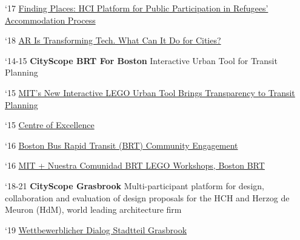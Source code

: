 \begin{tablist}
\begin{tablist}
      \item[`17] \tab \href{https://www.media.mit.edu/publications/finding-places/}{Finding Places: HCI Platform for Public Participation in Refugees’ Accommodation Process}

      \item[`18] \tab  \href{https://datasmart.ash.harvard.edu/news/article/ar-transforming-tech-what-can-it-do-cities}{AR Is Transforming Tech. What Can It Do for Cities?}

   \end{tablist}


   \item[`14-15] \tab \textbf{CityScope BRT For Boston} {Interactive Urban Tool for Transit Planning}

   \begin{tablist}

      \item[`15] \tab  \href{https://www.bloomberg.com/news/articles/2015-10-16/mit-s-new-interactive-lego-urban-tool-brings-transparency-to-transit-planning}
      {MIT's New Interactive LEGO Urban Tool Brings Transparency to Transit Planning}

      \item[`15] \tab  \href{http://www.brt.cl/new-tools-for-a-new-era-of-open-transportation-planning/}
      {Centre of Excellence}

      \item[`16] \tab  \href{https://www.media.mit.edu/projects/CityscopeBostonBRT/overview/}
      {Boston Bus Rapid Transit (BRT) Community Engagement}

      \item[`16] \tab  \href{http://www.bostonbrt.org/mit-nuestra-comunidad-brt-lego-workshops}
      {MIT + Nuestra Comunidad BRT LEGO Workshops, Boston BRT}

   \end{tablist}

   \item[`18-21] \tab \textbf{CityScope Grasbrook} {Multi-participant platform for design, collaboration and evaluation of design proposals for the HCH and Herzog de Meuron (HdM), world leading architecture firm}


   \begin{tablist}

      \item[`19] \tab \href{https://www.dropbox.com/sh/ozudl0rm7s78xwp/AAC7h_isLyXeCMCgBAxboDrDa?dl=0}{Wettbewerblicher Dialog Stadtteil Grasbrook}
   \end{tablist}




\end{tablist}


